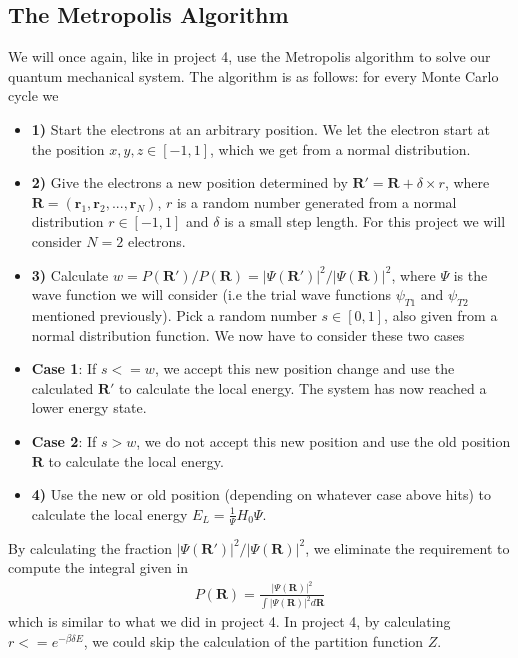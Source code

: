 \documentclass[12pt]{article}
\begin{document}
\subsection{The Metropolis Algorithm}
We will once again, like in project 4, use the Metropolis algorithm to solve our quantum mechanical system. The algorithm is as follows: for every Monte Carlo cycle we 
\begin{itemize}
\item \textbf{1)} Start the electrons at an arbitrary position. We let the electron start at the position $x,y,z \in [-1,1]$, which we get from a normal distribution.

\item \textbf{2)} Give the electrons a new position determined by $\mathbf{R}' = \mathbf{R} + \delta\times r$, where $\mathbf{R} = (\mathbf{r}_1, \mathbf{r}_2, ..., \mathbf{r}_N)$, $r$ is a random number generated from a normal distribution $r\in [-1,1]$ and $\delta$ is a small step length. For this project we will consider $N=2$ electrons.

\item \textbf{3)} Calculate $w = P(\mathbf{R}')/P(\mathbf{R}) = |\Psi(\mathbf{R}')|^2/|\Psi(\mathbf{R})|^2$, where $\Psi$ is the wave function we will consider (i.e the trial wave functions $\psi_{T1}$ and $\psi_{T2}$ mentioned previously). Pick a random number $s\in [0,1]$, also given from a normal distribution function. We now have to consider these two cases

\item \textbf{Case 1}: If $s <= w$, we accept this new position change and use the calculated $\mathbf{R}'$ to calculate the local energy. The system has now reached a lower energy state.

\item \textbf{Case 2}: If $s > w$, we do not accept this new position and use the old position $\mathbf{R}$ to calculate the local energy.

\item \textbf{4)} Use the new or old position (depending on whatever case above hits) to calculate the local energy $E_L = \frac{1}{\Psi} H_0\Psi$. 
\end{itemize}
By calculating the fraction $|\Psi(\mathbf{R}')|^2/|\Psi(\mathbf{R})|^2$, we eliminate the requirement to compute the integral given in
\begin{align*}
P(\mathbf{R}) = \frac{|\Psi(\mathbf{R})|^2}{\int |\Psi(\mathbf{R})|^2 d\mathbf{R}}
\end{align*}
which is similar to what we did in project 4. In project 4, by calculating $r<= e^{-\beta \delta E}$, we could skip the calculation of the partition function $Z$. 
\end{document}
